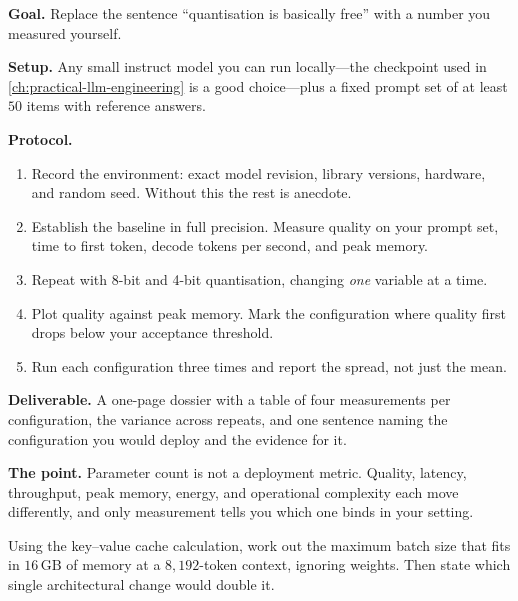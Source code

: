 \begin{practicallab}
\textbf{Goal.} Replace the sentence ``quantisation is basically free'' with a
number you measured yourself.

\textbf{Setup.} Any small instruct model you can run locally---the checkpoint
used in \cref{ch:practical-llm-engineering} is a good choice---plus a fixed
prompt set of at least $50$ items with reference answers.

\textbf{Protocol.}
\begin{enumerate}
  \item Record the environment: exact model revision, library versions,
        hardware, and random seed. Without this the rest is anecdote.
  \item Establish the baseline in full precision. Measure quality on your
        prompt set, time to first token, decode tokens per second, and peak
        memory.
  \item Repeat with 8-bit and 4-bit quantisation, changing \emph{one} variable
        at a time.
  \item Plot quality against peak memory. Mark the configuration where quality
        first drops below your acceptance threshold.
  \item Run each configuration three times and report the spread, not just the
        mean.
\end{enumerate}

\textbf{Deliverable.} A one-page dossier with a table of four measurements per
configuration, the variance across repeats, and one sentence naming the
configuration you would deploy and the evidence for it.

\textbf{The point.} Parameter count is not a deployment metric. Quality,
latency, throughput, peak memory, energy, and operational complexity each move
differently, and only measurement tells you which one binds in your setting.
\end{practicallab}

\begin{checkpoint}
Using the key--value cache calculation, work out the maximum batch size that
fits in $16\,\text{GB}$ of memory at a $8{,}192$-token context, ignoring
weights. Then state which single architectural change would double it.
\end{checkpoint}

